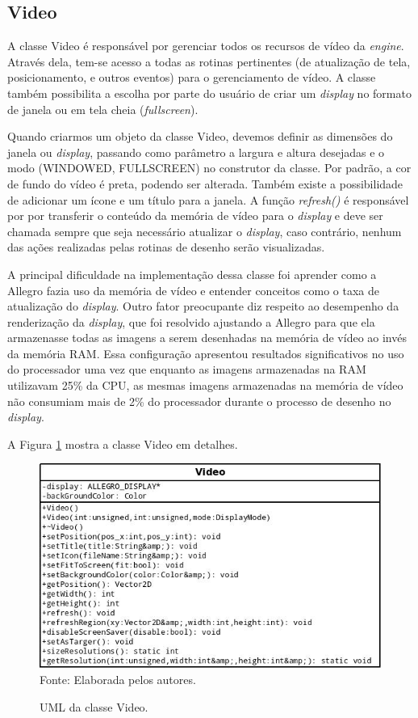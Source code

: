 \subsection{Video}
%
%
A classe Video é responsável por gerenciar todos os recursos de vídeo da \textit{engine}. Através dela, tem-se acesso a todas as rotinas pertinentes (de atualização de tela, posicionamento, e outros eventos) para o gerenciamento de vídeo. A classe também possibilita a escolha por parte do usuário de criar um \textit{display} no formato de janela ou em tela cheia (\textit{fullscreen}).
\par 
Quando criarmos um objeto da classe Video, devemos definir as dimensões do janela ou \textit{display}, passando como parâmetro a largura e altura desejadas e o modo (WINDOWED, FULLSCREEN) no construtor da classe. Por padrão, a cor de fundo do vídeo é preta, podendo ser alterada. Também existe a possibilidade de adicionar um ícone e um título para a janela. A função \textit{refresh()} é responsável por por transferir o conteúdo da memória de vídeo para o \textit{display} e deve ser chamada sempre que seja necessário atualizar o \textit{display}, caso contrário, nenhum das ações realizadas pelas rotinas de desenho serão visualizadas. 
\par 
A principal dificuldade na implementação dessa classe foi aprender como a Allegro fazia uso da memória de vídeo e entender conceitos como o taxa de atualização do \textit{display}. Outro fator preocupante diz respeito ao desempenho da renderização da \textit{display}, que foi resolvido ajustando a Allegro para que ela armazenasse todas as imagens a serem desenhadas na memória de vídeo ao invés da memória RAM. Essa configuração apresentou resultados significativos no uso do processador uma vez que enquanto as imagens armazenadas na RAM utilizavam 25\% da CPU, as mesmas imagens armazenadas na memória de vídeo não consumiam mais de 2\% do processador durante o processo de desenho no \textit{display}.
\par
A Figura \ref{umlVideo} mostra a classe Video em detalhes.
%
%
%
%
\begin{figure}[H]
    \centering
    \caption{UML da classe Video.}
    \label{umlVideo}
    \includegraphics[scale = 0.5]{uml/video.jpeg}
    \\Fonte: Elaborada pelos autores.
\end{figure}
